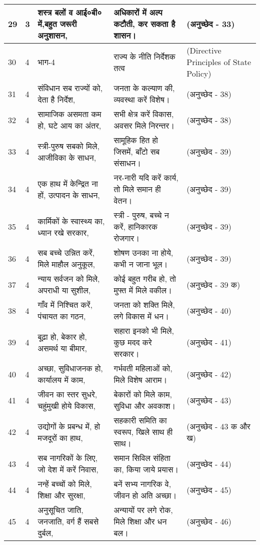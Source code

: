 \begin{longtable}{|l|l|l|l|l|}
29 & 3 & शस्त्र बलों व आई०बी० में,बहुत जरूरी अनुशासन, & अधिकारों में अल्प कटौती, कर सकता है शासन। & (अनुच्छेद - 33) \\ \hline 
30 & 4 & भाग-4 & राज्य के नीति निर्देशक तत्व & (Directive Principles of State Policy) \\ \hline 
31 & 4 & संविधान सब राज्यों को, देता है निर्देश, & जनता के कल्याण की, व्यवस्था करें विशेष। & (अनुच्छेद - 38) \\ \hline 
32 & 4 & सामाजिक असमता कम हो, घटे आय का अंतर, & सभी क्षेत्र करें विकास, अवसर मिले निरन्तर। & (अनुच्छेद - 38) \\ \hline 
33 & 4 & स्त्री-पुरुष सबको मिले, आजीविका के साधन, & सामूहिक हित हो जिसमें, बाँटो सब संसाधन। & (अनुच्छेद - 39) \\ \hline 
34 & 4 & एक हाथ में केन्द्रित ना हों, उत्पादन के साधन, & नर-नारी यदि करें कार्य, तो मिले समान ही वेतन। & (अनुच्छेद - 39) \\ \hline 
35 & 4 & कार्मिकों के स्वास्थ्य का, ध्यान रखे सरकार, & स्त्री - पुरुष, बच्चे न करें, हानिकारक रोजगार। & (अनुच्छेद - 39) \\ \hline 
36 & 4 & सब बच्चे उन्नित करें, मिले माहौल अनुकूल, & शोषण उनका ना होये, कभी न जाना भूल। & (अनुच्छेद - 39) \\ \hline 
37 & 4 & न्याय सर्वजन को मिले, अपराधी या सुशील, & कोई बहुत गरीब हो, तो मुफ्त में मिले वकील। & (अनुच्छेद - 39 क) \\ \hline 
38 & 4 & गाँव में निश्चित करें, पंचायत का गठन, & जनता को शक्ति मिले, लगे विकास में धन। & (अनुच्छेद - 40) \\ \hline 
39 & 4 & बूढ़ा हो, बेकार हो, असमर्थ या बीमार, & सहारा इनको भी मिले, कुछ मदद करे सरकार। & (अनुच्छेद - 41) \\ \hline 
40 & 4 & अच्छा, सुविधाजनक हो, कार्यालय में काम, & गर्भवती महिलाओं को, मिले विशेष आराम। & (अनुच्छेद - 42) \\ \hline 
41 & 4 & जीवन का स्तर सुधरे, चहुंमुखी होये विकास, & बेकारों को मिले काम, सुविधा और अवकाश। & (अनुच्छेद - 43) \\ \hline 
42 & 4 & उद्योगों के प्रबन्ध में, हो मजदूरों का हाथ, & सहकारी समिति का स्वरूप, खिले साथ ही साथ। & (अनुच्छेद - 43 क और ख) \\ \hline 
43 & 4 & सब नागरिकों के लिए, जो देश में करें निवास, & समान सिविल संहिता का, किया जाये प्रयास। & (अनुच्छेद - 44) \\ \hline 
44 & 4 & नन्हें बच्चों को मिले, शिक्षा और सुरक्षा, & बनें सभ्य नागरिक वे, जीवन हो अति अच्छा। & (अनुच्छेद - 45) \\ \hline 
45 & 4 & अनुसूचित जाति, जनजाति, वर्ग हैं सबसे दुर्बल, & अन्यायों पर लगे रोक, मिले शिक्षा और धन बल। & (अनुच्छेद - 46) \\ \hline 

\end{longtable}
